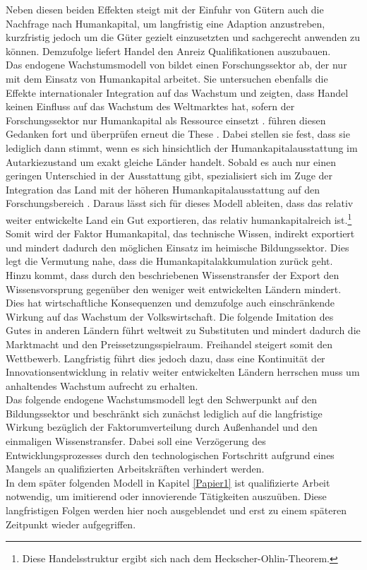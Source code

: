 Neben diesen beiden Effekten steigt mit der Einfuhr von Gütern auch die Nachfrage nach Humankapital, um langfristig eine Adaption anzustreben, kurzfristig jedoch um die Güter gezielt einzusetzten und sachgerecht anwenden zu können. Demzufolge liefert Handel den Anreiz Qualifikationen auszubauen. \\
%
Das endogene Wachstumsmodell von \cite{RiveraBatiz.1991a} bildet einen Forschungssektor ab, der nur mit dem Einsatz von Humankapital arbeitet. Sie untersuchen ebenfalls die Effekte internationaler Integration auf das Wachstum und zeigten, dass Handel keinen Einfluss auf das Wachstum des Weltmarktes hat, sofern der Forschungssektor nur Humankapital als Ressource einsetzt \cite{RiveraBatiz.1991a}. \cite{Devereux.1994} führen diesen Gedanken fort und überprüfen erneut die These \cite{RiveraBatiz.1991a}. Dabei stellen sie fest, dass sie lediglich dann stimmt, wenn es sich hinsichtlich der Humankapitalausstattung im Autarkiezustand um exakt gleiche Länder handelt. Sobald es auch nur einen geringen Unterschied in der Ausstattung gibt, spezialisiert sich im Zuge der Integration das Land mit der höheren Humankapitalausstattung auf den Forschungsbereich \cite{Devereux.1994}. Daraus lässt sich für dieses Modell ableiten, dass das relativ weiter entwickelte Land ein Gut exportieren, das relativ humankapitalreich ist.\footnote{Diese Handelsstruktur ergibt sich nach dem Heckscher-Ohlin-Theorem.} Somit wird der Faktor Humankapital, das technische Wissen, indirekt exportiert und mindert dadurch den möglichen Einsatz im heimische Bildungssektor. Dies legt die Vermutung nahe, dass die Humankapitalakkumulation zurück geht. Hinzu kommt, dass durch den beschriebenen Wissenstransfer der Export den Wissensvorsprung gegenüber den weniger weit entwickelten Ländern mindert. Dies hat wirtschaftliche Konsequenzen und demzufolge auch einschränkende Wirkung auf das Wachstum der Volkswirtschaft. Die folgende Imitation des Gutes in anderen Ländern führt weltweit zu Substituten und mindert dadurch die Marktmacht und den Preissetzungsspielraum. Freihandel steigert somit den Wettbewerb. Langfristig führt dies jedoch dazu, dass eine Kontinuität der Innovationsentwicklung in relativ weiter entwickelten Ländern herrschen muss um anhaltendes Wachstum aufrecht zu erhalten. \\
%
Das folgende endogene Wachstumsmodell legt den Schwerpunkt auf den Bildungssektor und  beschränkt sich zunächst lediglich auf die langfristige Wirkung bezüglich der Faktorumverteilung durch Außenhandel und den einmaligen Wissenstransfer. Dabei soll eine Verzögerung des Entwicklungsprozesses durch den technologischen Fortschritt aufgrund eines Mangels an qualifizierten Arbeitskräften verhindert werden.\\
%
In dem später folgenden Modell in Kapitel \ref{Papier1} ist qualifizierte Arbeit notwendig, um imitierend oder innovierende Tätigkeiten auszuüben. Diese langfristigen Folgen werden hier noch ausgeblendet und erst zu einem späteren Zeitpunkt wieder aufgegriffen. \\
%

